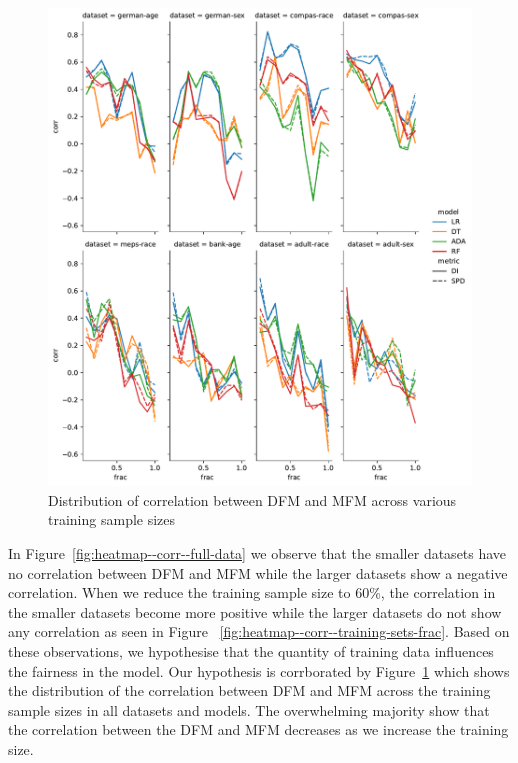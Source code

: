 \documentclass{article}
\begin{document}
\begin{figure}
  \centering
  \includegraphics[width=0.95\linewidth]{lineplot--frac--corr.pdf}
  \caption{Distribution of correlation between DFM and MFM across
    various training sample sizes}
  \label{fig:lineplot--frac--corr}
\end{figure}

In Figure \ref{fig:heatmap--corr--full-data} we observe that the
smaller datasets have no correlation between DFM and MFM while the
larger datasets show a negative correlation. When we reduce the
training sample size to 60\%, the correlation in the smaller datasets
become more positive while the larger datasets do not show any
correlation as seen in Figure
 \ref{fig:heatmap--corr--training-sets-frac}. Based on these
observations, we hypothesise that the quantity of training data
influences the fairness in the model. Our hypothesis is corrborated by
Figure \ref{fig:lineplot--frac--corr} which shows the distribution of
the correlation between DFM and MFM across the training sample sizes
in all datasets and models. The overwhelming majority show that the
correlation between the DFM and MFM decreases as we increase the
training size.

\end{document}

